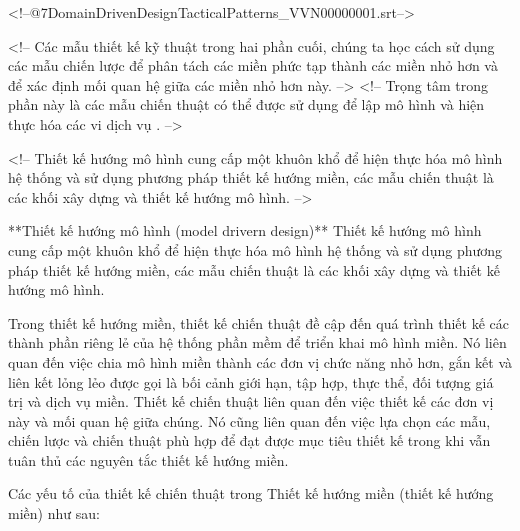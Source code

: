 <!--@\07DomainDrivenDesignTacticalPatterns_VVN\000000001.srt-->
 
<!-- Các mẫu thiết kế kỹ thuật trong hai phần cuối, chúng ta học cách sử dụng các mẫu chiến lược để phân tách các miền phức tạp thành các miền nhỏ hơn và để xác định mối quan hệ giữa các miền nhỏ hơn này. --> 
<!-- Trọng tâm trong phần này là các mẫu chiến thuật có thể được sử dụng để lập mô hình và hiện thực hóa các vi dịch vụ . -->
 


<!-- Thiết kế hướng mô hình cung cấp một khuôn khổ để hiện thực hóa mô hình hệ thống và sử dụng phương pháp thiết kế hướng miền, các mẫu chiến thuật là các khối xây dựng và thiết kế hướng mô hình. -->

**Thiết kế hướng mô hình (model drivern design)**
Thiết kế hướng mô hình cung cấp một khuôn khổ để hiện thực hóa mô hình hệ thống và sử dụng phương pháp thiết kế hướng miền, các mẫu chiến thuật là các khối xây dựng và thiết kế hướng mô hình.





Trong thiết kế hướng miền, thiết kế chiến thuật đề cập đến quá trình thiết kế các thành phần riêng lẻ của hệ thống phần mềm để triển khai mô hình miền. Nó liên quan đến việc chia mô hình miền thành các đơn vị chức năng nhỏ hơn, gắn kết và liên kết lỏng lẻo được gọi là bối cảnh giới hạn, tập hợp, thực thể, đối tượng giá trị và dịch vụ miền. Thiết kế chiến thuật liên quan đến việc thiết kế các đơn vị này và mối quan hệ giữa chúng. Nó cũng liên quan đến việc lựa chọn các mẫu, chiến lược và chiến thuật phù hợp để đạt được mục tiêu thiết kế trong khi vẫn tuân thủ các nguyên tắc thiết kế hướng miền.

Các yếu tố của thiết kế chiến thuật trong Thiết kế hướng miền (thiết kế hướng miền) như sau:






